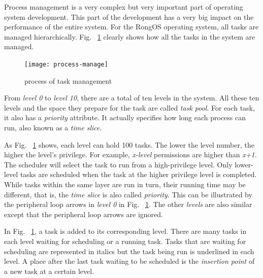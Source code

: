 \documentclass{swfcthesis}
\begin{document}
Process management is a very complex but very important part of operating system
development. This part of the development has a very big impact on the performance of the
entire system. For the RongOS operating system, all tasks are managed
hierarchically. Fig. ~\ref{fig:proc-manage} clearly shows how all the tasks in the system
are managed.



\begin{figure}[!ht]
  \centering
  \texttt{[image: process-manage]}
  \caption{process of task management}
  \label{fig:proc-manage}
\end{figure}



From \emph{level 0} to \emph{level 10}, there are a total of ten levels in
the system. All these ten levels and the space they prepare for the task are called \emph{task
  pool}. For each task, it also has a \emph{priority} attribute. It actually specifies how
long each process can run, also known as a \emph{time slice}. 


As Fig. ~\ref{fig:proc-manage} shows, each level can hold 100 tasks. The lower the
level number, the higher the level's privilege. For example, \emph{x-level} permissions are
higher than \emph{x+1}. The scheduler will select the task to run from a high-privilege
level. Only lower-level tasks are scheduled when the task at the higher privilege level is
completed. While tasks within the same layer are run in turn, their running time may be
different, that is,  the \emph{time slice} is also called \emph{priority}. This can be
illustrated by the peripheral loop arrows in \emph{level 0} in
Fig. ~\ref{fig:proc-manage}. The other \emph{levels} are also similar except that the
peripheral loop arrows are ignored.



In Fig. ~\ref{fig:proc-manage}, a task is added to its corresponding
level. There are many tasks in each level waiting for scheduling or a running task. Tasks
that are waiting for scheduling are represented in italics but the task being run is
underlined in each level. A place after the last task waiting to be scheduled is the
\emph{insertion point} of a new task at a certain level.
\end{document}
